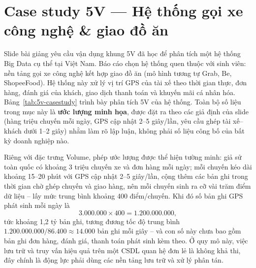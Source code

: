 \documentclass[12pt,a4paper,oneside]{article}
\begin{document}
\section{Case study 5V --- Hệ thống gọi xe công nghệ \& giao đồ ăn}
\label{sec:5v-casestudy}

Slide bài giảng yêu cầu vận dụng khung 5V đã học để phân tích một hệ thống Big Data cụ thể tại Việt Nam. Báo cáo chọn hệ thống quen thuộc với sinh viên: nền tảng gọi xe công nghệ kết hợp giao đồ ăn (mô hình tương tự Grab, Be, ShopeeFood). Hệ thống này xử lý vị trí GPS của tài xế theo thời gian thực, đơn hàng, đánh giá của khách, giao dịch thanh toán và khuyến mãi cá nhân hóa. Bảng~\ref{tab:5v-casestudy} trình bày phân tích 5V của hệ thống. Toàn bộ số liệu trong mục này là \textbf{ước lượng minh họa}, được đặt ra theo các giả định của slide (hàng triệu chuyến mỗi ngày, GPS cập nhật 2--5 giây/lần, yêu cầu ghép tài xế--khách dưới 1--2 giây) nhằm làm rõ lập luận, không phải số liệu công bố của bất kỳ doanh nghiệp nào.

Riêng với đặc trưng Volume, phép ước lượng được thể hiện tường minh: giả sử toàn quốc có khoảng 3 triệu chuyến xe và đơn hàng mỗi ngày; mỗi chuyến kéo dài khoảng 15--20 phút với GPS cập nhật 2--5 giây/lần, cộng thêm các bản ghi trong thời gian chờ ghép chuyến và giao hàng, nên mỗi chuyến sinh ra cỡ vài trăm điểm dữ liệu -- lấy mức trung bình khoảng 400 điểm/chuyến. Khi đó số bản ghi GPS phát sinh mỗi ngày là
\[
3.000.000 \times 400 = 1.200.000.000,
\]
tức khoảng 1,2 tỷ bản ghi, tương đương tốc độ trung bình $1.200.000.000 / 86.400 \approx 14.000$ bản ghi mỗi giây -- và con số này chưa bao gồm bản ghi đơn hàng, đánh giá, thanh toán phát sinh kèm theo. Ở quy mô này, việc lưu trữ và truy vấn hiệu quả trên một CSDL quan hệ đơn lẻ là không khả thi, đây chính là động lực phải dùng các nền tảng lưu trữ và xử lý phân tán.
\end{document}
